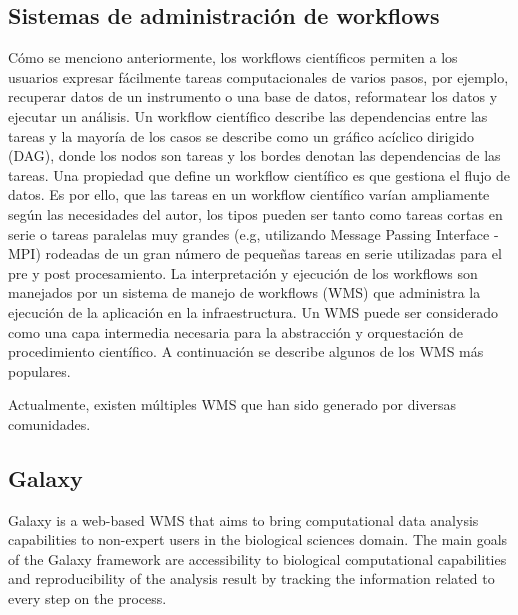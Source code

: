 


\subsection{Sistemas de administración de workflows}

Cómo se menciono anteriormente, los workflows científicos permiten a los usuarios expresar fácilmente tareas computacionales de varios pasos, por ejemplo, recuperar datos de un instrumento o una base de datos, reformatear los datos y ejecutar un análisis. 
Un workflow científico describe las dependencias entre las tareas y la mayoría de los casos se describe como un gráfico acíclico dirigido (DAG), donde los nodos son tareas y los bordes denotan las dependencias de las tareas.
Una propiedad que define un workflow científico es que gestiona el flujo de datos. Es por ello, que las tareas en un  workflow científico varían ampliamente según las necesidades del autor, los tipos pueden ser tanto como tareas cortas en serie o tareas paralelas muy grandes (e.g, utilizando Message Passing Interface - MPI) rodeadas de un gran número de pequeñas tareas en serie utilizadas para el pre y post procesamiento.
La interpretación y ejecución de los workflows son manejados por un sistema de manejo de workflows (WMS) que administra la ejecución de la aplicación en la infraestructura. 
Un WMS puede ser considerado como una capa intermedia necesaria para la abstracción y orquestación de procedimiento científico. A continuación se describe algunos de los WMS más populares.

Actualmente, existen múltiples WMS que han sido generado por diversas comunidades.
\subsection{Galaxy}	
Galaxy \citep{goecks2010galaxy} is a web-based WMS that aims to bring computational data analysis capabilities to non-expert users in the biological sciences domain. The main goals of the Galaxy framework are accessibility to biological computational capabilities and reproducibility of the analysis result by tracking the information related to every step on the process. 

